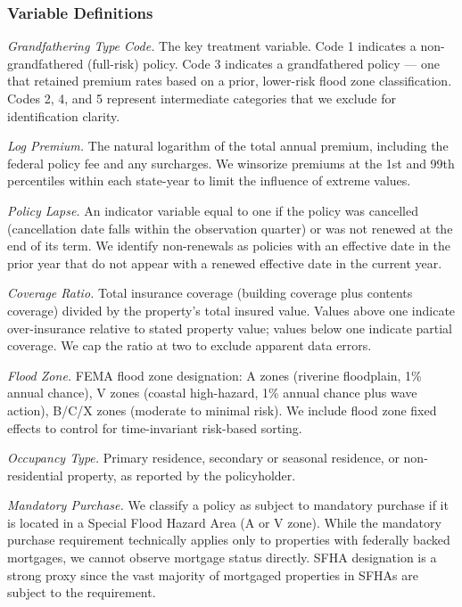 \documentclass[12pt]{article}
\begin{document}
\subsubsection*{Variable Definitions}

\textit{Grandfathering Type Code.} The key treatment variable. Code 1 indicates a non-grandfathered (full-risk) policy. Code 3 indicates a grandfathered policy --- one that retained premium rates based on a prior, lower-risk flood zone classification. Codes 2, 4, and 5 represent intermediate categories that we exclude for identification clarity.

\textit{Log Premium.} The natural logarithm of the total annual premium, including the federal policy fee and any surcharges. We winsorize premiums at the 1st and 99th percentiles within each state-year to limit the influence of extreme values.

\textit{Policy Lapse.} An indicator variable equal to one if the policy was cancelled (cancellation date falls within the observation quarter) or was not renewed at the end of its term. We identify non-renewals as policies with an effective date in the prior year that do not appear with a renewed effective date in the current year.

\textit{Coverage Ratio.} Total insurance coverage (building coverage plus contents coverage) divided by the property's total insured value. Values above one indicate over-insurance relative to stated property value; values below one indicate partial coverage. We cap the ratio at two to exclude apparent data errors.

\textit{Flood Zone.} FEMA flood zone designation: A zones (riverine floodplain, 1\% annual chance), V zones (coastal high-hazard, 1\% annual chance plus wave action), B/C/X zones (moderate to minimal risk). We include flood zone fixed effects to control for time-invariant risk-based sorting.

\textit{Occupancy Type.} Primary residence, secondary or seasonal residence, or non-residential property, as reported by the policyholder.

\textit{Mandatory Purchase.} We classify a policy as subject to mandatory purchase if it is located in a Special Flood Hazard Area (A or V zone). While the mandatory purchase requirement technically applies only to properties with federally backed mortgages, we cannot observe mortgage status directly. SFHA designation is a strong proxy since the vast majority of mortgaged properties in SFHAs are subject to the requirement.
\end{document}
